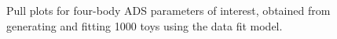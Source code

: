 \begin{figure}
\begin{tabular}{c}
  \end{tabular}
  \caption{Pull plots for four-body ADS parameters of interest, obtained from generating and fitting 1000 toys using the data fit model.}
\label{fig:fourBody_ADS_pulls}
\end{figure}
